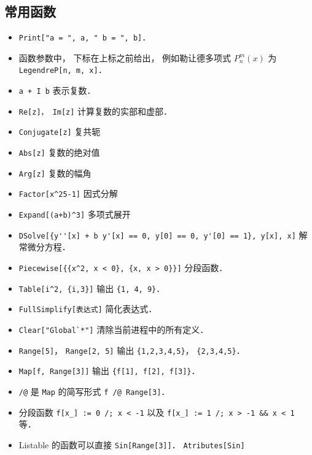 \subsection{常用函数}
\begin{itemize}
\item \verb|Print["a = ", a, " b = ", b]|．
\item 函数参数中， 下标在上标之前给出， 例如勒让德多项式 $P_n^m(x)$ 为 \verb|LegendreP[n, m, x]|．
\item \verb|a + I b| 表示复数．
\item \verb|Re[z]， Im[z]| 计算复数的实部和虚部．
\item \verb|Conjugate[z]| 复共轭
\item \verb|Abs[z]| 复数的绝对值
\item \verb|Arg[z]| 复数的幅角
\item \verb|Factor[x^25-1]| 因式分解
\item \verb|Expand[(a+b)^3]| 多项式展开
\item \verb|DSolve[{y''[x] + b y'[x] == 0, y[0] == 0, y'[0] == 1}, y[x], x]| 解常微分方程．
\item \verb|Piecewise[{{x^2, x < 0}, {x, x > 0}}]| 分段函数．
\item \verb|Table[i^2, {i,3}]| 输出 \verb|{1, 4, 9}|．
\item \verb|FullSimplify[表达式]| 简化表达式．
\item \verb|Clear["Global`*"]| 清除当前进程中的所有定义．
\item \verb|Range[5]|， \verb|Range[2, 5]| 输出 \verb|{1,2,3,4,5}|， \verb|{2,3,4,5}|．
\item \verb|Map[f, Range[3]]| 输出 \verb|{f[1], f[2], f[3]}|．
\item \verb|/@| 是 \verb|Map| 的简写形式 \verb|f /@ Range[3]|．
\item 分段函数 \verb|f[x_] := 0 /; x < -1| 以及 \verb|f[x_] := 1 /; x > -1 && x < 1| 等．
\item Listable 的函数可以直接 \verb|Sin[Range[3]]|． \verb|Atributes[Sin]|
\end{itemize}

